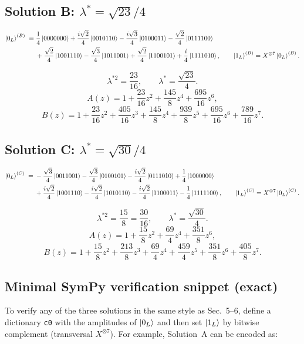 \documentclass[11pt]{article}
\begin{document}
\subsection{Solution B: \texorpdfstring{$\lambda^\ast=\sqrt{23}/4$}{lambda*=sqrt(23)/4}}

\[
\begin{aligned}
\ket{0_L}^{(B)} \;=\;
&\frac{1}{4}\ket{0000000}
+\frac{i\sqrt2}{4}\ket{0010110}
-\frac{i\sqrt3}{4}\ket{0100011}
-\frac{\sqrt2}{4}\ket{0111100}\\
&+\frac{\sqrt2}{4}\ket{1001110}
-\frac{\sqrt3}{4}\ket{1011001}
+\frac{\sqrt2}{4}\ket{1100101}
+\frac{i}{4}\ket{1111010},
\qquad
\ket{1_L}^{(B)} = X^{\otimes 7}\ket{0_L}^{(B)}.
\end{aligned}
\]

\[
\boxed{\lambda^{\ast 2}=\frac{23}{16},\qquad \lambda^\ast=\frac{\sqrt{23}}{4}.}
\]
\[
A(z)=1+\frac{23}{16}z^2+\frac{145}{8}z^4+\frac{695}{16}z^6,
\]
\[
B(z)=1+\frac{23}{16}z^2+\frac{405}{16}z^3+\frac{145}{8}z^4+\frac{939}{8}z^5+\frac{695}{16}z^6+\frac{789}{16}z^7.
\]

\subsection{Solution C: \texorpdfstring{$\lambda^\ast=\sqrt{30}/4$}{lambda*=sqrt(30)/4}}

\[
\begin{aligned}
\ket{0_L}^{(C)} \;=\;
&-\frac{\sqrt3}{4}\ket{0011001}
-\frac{\sqrt3}{4}\ket{0100101}
-\frac{i\sqrt2}{4}\ket{0111010}
+\frac{1}{4}\ket{1000000}\\
&+\frac{i\sqrt2}{4}\ket{1001110}
-\frac{i\sqrt2}{4}\ket{1010110}
-\frac{i\sqrt2}{4}\ket{1100011}
-\frac{1}{4}\ket{1111100},
\qquad
\ket{1_L}^{(C)} = X^{\otimes 7}\ket{0_L}^{(C)}.
\end{aligned}
\]

\[
\boxed{\lambda^{\ast 2}=\frac{15}{8}=\frac{30}{16},\qquad \lambda^\ast=\frac{\sqrt{30}}{4}.}
\]
\[
A(z)=1+\frac{15}{8}z^2+\frac{69}{4}z^4+\frac{351}{8}z^6,
\]
\[
B(z)=1+\frac{15}{8}z^2+\frac{213}{8}z^3+\frac{69}{4}z^4+\frac{459}{4}z^5+\frac{351}{8}z^6+\frac{405}{8}z^7.
\]

\subsection{Minimal SymPy verification snippet (exact)}

To verify any of the three solutions in the same style as Sec.~5--6, define a dictionary \texttt{c0} with the amplitudes of \(\ket{0_L}\) and then set \(\ket{1_L}\) by bitwise complement (transversal \(X^{\otimes 7}\)). For example, Solution~A can be encoded as:
\end{document}

